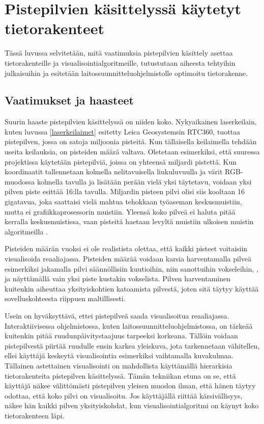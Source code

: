 \section{Pistepilvien käsittelyssä käytetyt tietorakenteet}

Tässä luvussa selvitetään, mitä vaatimuksia pistepilvien käsittely asettaa tietorakenteille ja visualisointialgoritmeille, tutustutaan aiheesta tehtyihin julkaisuihin ja esitetään laitossuunnitteluohjelmistolle optimoitu tietorakenne.

\subsection{Vaatimukset ja haasteet}

Suurin haaste pistepilvien käsittelyssä on niiden koko. Nykyaikainen laserkeilain, kuten luvussa \ref{laserkeilaimet} esitetty Leica Geosystemsin RTC360, tuottaa pistepilven, jossa on satoja miljoonia pisteitä. Kun tällaisella keilaimella tehdään useita keilauksia, on pisteiden määrä valtava. Oletetaan esimerkiksi, että suuressa projektissa käytetään pistepilviä, joissa on yhteensä miljardi pistettä. Kun koordinaatit tallennetaan kolmella nelitavuisella liukuluvuulla ja värit RGB-muodossa kolmella tavulla ja lisätään perään vielä yksi täytetavu, voidaan yksi pilven piste esittää 16:lla tavulla. Miljardin pisteen pilvi olisi siis kooltaan 16 gigatavua, joka saattaisi vielä mahtua tehokkaan työaseman keskusmuistiin, mutta ei grafiikkaprosessorin muistiin. Yleensä koko pilveä ei haluta pitää kerralla keskusmuistissa, vaan pisteitä haetaan levyltä muistiin ulkoisen muistin algoritmeilla .

Pisteiden määrän vuoksi ei ole realistista olettaa, että kaikki pisteet voitaisiin visualisoida reaaliajassa. Pisteiden määrää voidaan karsia harventamalla pilveä esimerkiksi jakamalla pilvi säännöllisiin kuutioihin, niin sanottuihin vokseleihin, , ja näyttämällä vain yksi piste kustakin vokselista. %
Pilven harventaminen kuitenkin aiheuttaa yksityiskohtien katoamista pilvestä, joten sitä täytyy käyttää sovelluskohteesta riippuen maltillisesti. 

Usein on hyväksyttävä, ettei pistepilveä saada visualisoitua reaaliajassa. Interaktiivisessa ohjelmistossa, kuten laitossuunnitteluohjelmistossa, on tärkeää kuitenkin pitää ruudunpäivitystaajuus tarpeeksi korkeana. Tällöin voidaan pistepilvestä piirtää ruudulle ensin karkea yleiskuva, jota tarkennetaan vähitellen, ellei käyttäjä keskeytä visualisointia esimerkiksi vaihtamalla kuvakulmaa. Tällainen astettainen visualisointi on mahdollista käyttämällä hierarkisia tietorakenteita pistepilven käsittelyssä. Tämän tekniikan etuna on se, että käyttäjä näkee välittömästi pistepilven yleisen muodon ilman, että hänen täytyy odottaa, että koko pilvi on visualisoitu. Jos käyttäjällä riittää kärsivällisyys, näkee hän kaikki pilven yksityiskohdat, kun visualisointialgoritmi on käynyt koko tietorakenteen läpi. 

